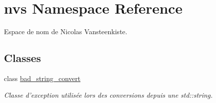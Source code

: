 \hypertarget{namespacenvs}{\section{nvs Namespace Reference}
\label{namespacenvs}
}


Espace de nom de Nicolas Vansteenkiste.  


\subsection*{Classes}
\begin{DoxyCompactItemize}
\item 
class \hyperlink{classnvs_1_1bad__string__convert}{bad\+\_\+string\+\_\+convert}
\begin{DoxyCompactList}\small\item\em Classe d'exception utilisée lors des conversions depuis une {\ttfamily std\+::string}. \end{DoxyCompactList}\end{DoxyCompactItemize}

